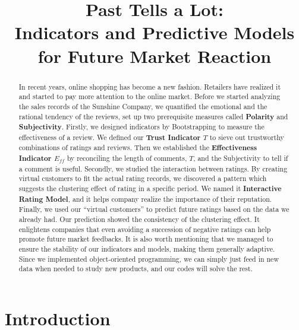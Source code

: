 \documentclass[12pt]{article}  %
\title{Past Tells a Lot:\\Indicators and Predictive Models for Future Market Reaction}  %
\begin{document}
\begin{abstract}
  In recent years, online shopping has become a new fashion. Retailers have realized it and started to pay more attention to the online market.
Before we started analyzing the sales records of the Sunshine Company, we quantified the emotional and the rational tendency of the reviews, set up two prerequisite measures called \textbf{Polarity} and \textbf{Subjectivity}.
Firstly, we designed indicators by Bootstrapping to measure the effectiveness of a review. We defined our \textbf{Trust Indicator $T$} to sieve out trustworthy combinations of ratings and reviews. Then we established the\textbf{ Effectiveness Indicator $E_{ff}$} by reconciling the length of comments, $T$, and the Subjectivity to tell if a comment is useful.
Secondly, we studied the interaction between ratings. By creating virtual customers to fit the actual rating records, we discovered a pattern which suggests the clustering effect of rating in a specific period. We named it \textbf{Interactive Rating Model}, and it helps company realize the importance of their reputation.
Finally, we used our “virtual customers” to predict future ratings based on the data we already had. Our prediction showed the consistency of the clustering effect. It enlightens companies that even avoiding a succession of negative ratings can help promote future market feedbacks.
It is also worth mentioning that we managed to ensure the stability of our indicators and models, making them generally adaptive. Since we implemented object-oriented programming, we can simply just feed in new data when needed to study new products, and our codes will solve the rest.


\end{abstract}

\maketitle  %
\tableofcontents  %


\section{Introduction}
\end{document}
